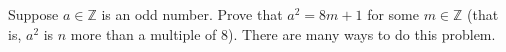 Suppose $a \in \mathbb{Z}$ is an odd number. Prove that $a^2 = 8m + 1$ for some $m \in \mathbb{Z}$ (that is, $a^2$ is $n$ more than a multiple of $8$). There are many ways to do this problem.